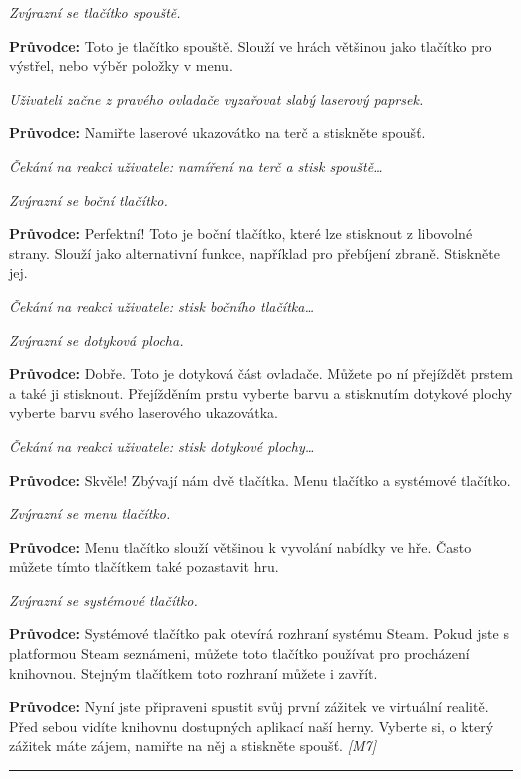 \emph{Zvýrazní se tlačítko spouště.}

\textbf{Průvodce:} Toto je tlačítko spouště. Slouží ve hrách většinou
jako tlačítko pro výstřel, nebo výběr položky v menu.

\emph{Uživateli začne z pravého ovladače vyzařovat slabý laserový
paprsek.}

\textbf{Průvodce:} Namiřte laserové ukazovátko na terč a stiskněte
spoušť.

\emph{Čekání na reakci uživatele: namíření na terč a stisk
spouště\ldots{}}

\emph{Zvýrazní se boční tlačítko.}

\textbf{Průvodce:} Perfektní! Toto je boční tlačítko, které lze
stisknout z libovolné strany. Slouží jako alternativní funkce, například
pro přebíjení zbraně. Stiskněte jej.

\emph{Čekání na reakci uživatele: stisk bočního tlačítka\ldots{}}

\emph{Zvýrazní se dotyková plocha.}

\textbf{Průvodce:} Dobře. Toto je dotyková část ovladače. Můžete po ní
přejíždět prstem a také ji stisknout. Přejížděním prstu vyberte barvu a
stisknutím dotykové plochy vyberte barvu svého laserového ukazovátka.

\emph{Čekání na reakci uživatele: stisk dotykové plochy\ldots{}}

\textbf{Průvodce:} Skvěle! Zbývají nám dvě tlačítka. Menu tlačítko a
systémové tlačítko.

\emph{Zvýrazní se menu tlačítko.}

\textbf{Průvodce:} Menu tlačítko slouží většinou k vyvolání nabídky ve
hře. Často můžete tímto tlačítkem také pozastavit hru.

\emph{Zvýrazní se systémové tlačítko.}

\textbf{Průvodce:} Systémové tlačítko pak otevírá rozhraní systému
Steam. Pokud jste s platformou Steam seznámeni, můžete toto tlačítko
používat pro procházení knihovnou. Stejným tlačítkem toto rozhraní
můžete i zavřít.

\textbf{Průvodce:} Nyní jste připraveni spustit svůj první zážitek ve
virtuální realitě. Před sebou vidíte knihovnu dostupných aplikací naší
herny. Vyberte si, o který zážitek máte zájem, namiřte na něj a
stiskněte spoušť. \emph{{[}M7{]}}

\begin{center}\rule{0.5\linewidth}{\linethickness}\end{center}

